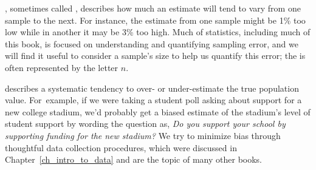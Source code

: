 


,
sometimes called \emph{},
describes how much an estimate will tend to vary from
one sample to the next.
For instance, the estimate from one sample might be 1\% too low
while in another it may be 3\% too high.
Much of statistics, including much of this book,
is focused on understanding and quantifying sampling error,
and we will find it useful to consider a sample's size
to help us quantify this error;
the  is often represented by the letter $n$.

 describes a systematic tendency
to over- or under-estimate the true population value.
For~example, if we were taking a student poll asking
about support for a new college stadium, we'd probably
get a biased estimate of the stadium's level of student
support by wording the question as,
\emph{Do you support your school by supporting funding
  for the new stadium?}
We try to minimize bias through thoughtful data
collection procedures, which were discussed in
Chapter~\ref{ch_intro_to_data}
and are the topic of many other books.


